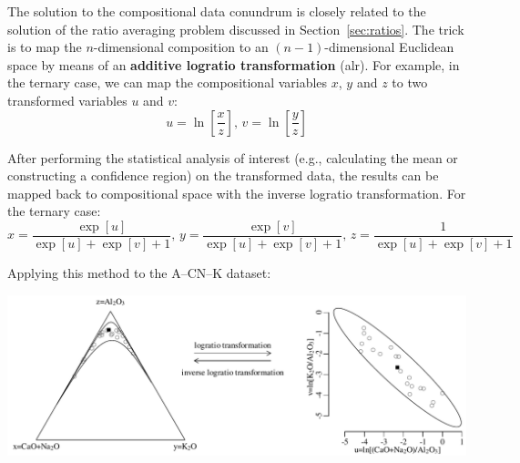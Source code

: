 The solution to the compositional data conundrum is closely related to
the solution of the ratio averaging problem discussed in
Section~\ref{sec:ratios}. The trick is to map the $n$-dimensional
composition to an $(n-1)$-dimensional Euclidean space by means of an
\textbf{additive logratio transformation} (alr). For example, in the
ternary case, we can map the compositional variables $x$, $y$ and $z$
to two transformed variables $u$ and $v$:
\begin{equation}
  u = \ln\!\left[\frac{x}{z}\right] \mbox{,~} v =
  \ln\!\left[\frac{y}{z}\right]
  \label{eq:alr}
\end{equation}

After performing the statistical analysis of interest (e.g.,
calculating the mean or constructing a confidence region) on the
transformed data, the results can be mapped back to compositional
space with the inverse logratio transformation. For the ternary case:
\begin{equation}
  x = \frac{\exp[u]}{\exp[u] + \exp[v] + 1} \mbox{,~}
  y = \frac{\exp[v]}{\exp[u] + \exp[v] + 1} \mbox{,~}
  z = \frac{1}{\exp[u] + \exp[v] + 1}
  \label{eq:inverse-logratio-transformation}
\end{equation}

Applying this method to the A--CN--K dataset:\medskip

\noindent\includegraphics[width=\linewidth]{../figures/alr.PDF}
\begingroup {}
\label{fig:alr}\endgroup

